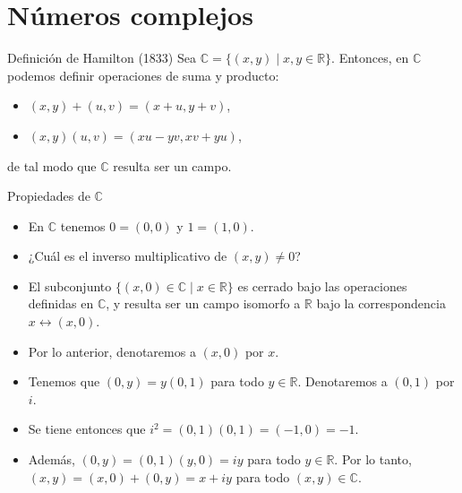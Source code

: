 \documentclass[spanish,presentation]{beamer}
\begin{document}
\section{Números complejos}
\label{sec-3}

\begin{frame}[label=sec-3-1]{Definición de Hamilton (1833)}
Sea \(\mathbb{C}=\{(x,y)\mid x,y\in \mathbb{R}\}\). Entonces, en
\(\mathbb{C}\) podemos definir operaciones de suma y producto:

\begin{itemize}
\item \((x,y)+(u,v)=(x+u,y+v)\),
\item \((x,y)(u,v)=(xu-yv,xv+yu)\),
\end{itemize}

de tal modo que \(\mathbb{C}\) resulta ser un campo.
\end{frame}

\begin{frame}[label=sec-3-2]{Propiedades de \(\mathbb{C}\)}
\begin{itemize}
\item En \(\mathbb{C}\) tenemos \(0=(0,0)\) y \(1=(1,0)\).
\item ¿Cuál es el inverso multiplicativo de \((x,y)\ne 0\)?
\item El subconjunto \(\{(x,0)\in \mathbb{C}\mid x\in \mathbb{R}\}\)
es cerrado bajo las operaciones definidas en \(\mathbb{C}\), y
resulta ser un campo isomorfo a \(\mathbb{R}\) bajo la
correspondencia \(x\leftrightarrow (x,0)\).
\item Por lo anterior, denotaremos a \((x,0)\) por \(x\).
\item Tenemos que \((0,y)=y(0,1)\) para todo \(y\in
     \mathbb{R}\). Denotaremos a \((0,1)\) por \(i\).
\item Se tiene entonces que \(i^{2}=(0,1)(0,1)=(-1,0)=-1.\)
\item Además, \((0,y)=(0,1)(y,0)=iy\) para todo \(y\in\mathbb{R}\). Por
lo tanto, \((x,y)=(x,0)+(0,y)=x+iy\) para todo
\((x,y)\in\mathbb{C}\).
\end{itemize}
\end{frame}
\end{document}
